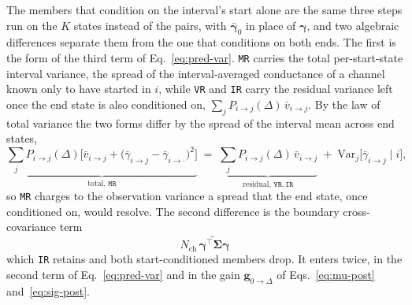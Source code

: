 The members that condition on the interval's start alone are the same three steps run on the
$K$ states instead of the pairs, with $\bar{\bm{\gamma}}_0$ in place of $\bm{\gamma}$, and two
algebraic differences separate them from the one that conditions on both ends. The first is
the form of the third term of Eq.~\ref{eq:pred-var}.
\texttt{MR} carries the total per-start-state interval variance, the spread of the
interval-averaged conductance of a channel known only to have started in $i$, while
\texttt{VR} and \texttt{IR} carry the residual variance left once the end state is also
conditioned on, $\sum_{j} P_{i\to j}(\Delta)\,\bar{v}_{i\to j}$. By the law
of total variance the two forms differ by the spread of the interval mean across end
states,
\begin{equation}
  \underbrace{\sum_{j} P_{i\to j}(\Delta)\bigl[\bar{v}_{i\to j}
    + \bigl(\bar{\gamma}_{i\to j}-\bar{\gamma}_{i\to\cdot}\bigr)^2\bigr]}_{\text{total, }\texttt{MR}}
  \;=\; \underbrace{\sum_{j} P_{i\to j}(\Delta)\,\bar{v}_{i\to j}}_{\text{residual, }\texttt{VR},\,\texttt{IR}}
  \;+\; \mathrm{Var}_{j}\bigl[\bar{\gamma}_{i\to j}\mid i\bigr],
  \label{eq:mr-vr}
\end{equation}
so \texttt{MR} charges to the observation variance a spread that the end state, once
conditioned on, would resolve. The second difference is the boundary cross-covariance term
\begin{equation}
  N_{\mathrm{ch}}\,\widetilde{\bm{\gamma}^\top\bm{\Sigma}\bm{\gamma}}
  \label{eq:mr-ir}
\end{equation}
which \texttt{IR} retains and both start-conditioned members drop. It enters twice, in the
second term of Eq.~\ref{eq:pred-var} and in the gain $\mathbf{g}_{0\to\Delta}$ of
Eqs.~\ref{eq:mu-post} and~\ref{eq:sig-post}.

